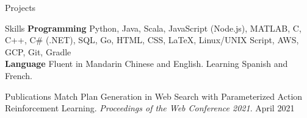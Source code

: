 \documentclass{resume}
\begin{document}
\begin{rSection}{Projects}

\end{rSection}

\begin{rSection}{Skills}
{\bf Programming }Python, Java, Scala, JavaScript (Node.js), MATLAB, C, C++, C\# (.NET), SQL, Go, HTML, CSS, LaTeX, Linux/UNIX Script, AWS, GCP, Git, Gradle %
\\{\bf Language }Fluent in Mandarin Chinese and English. Learning Spanish and French.
\end{rSection}

\begin{rSection}{Publications}
Match Plan Generation in Web Search with Parameterized Action Reinforcement Learning. {\em Proceedings of the Web Conference 2021}. April 2021
\end{rSection}
\end{document}
